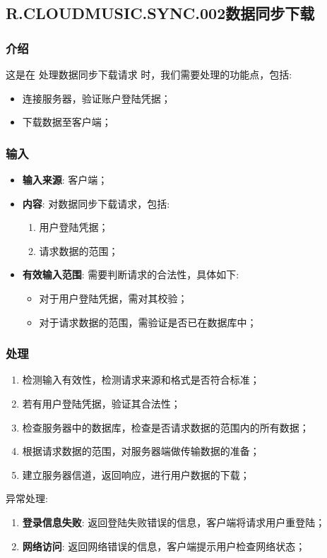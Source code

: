 \begin{enumerate}
\subsection{R.CLOUDMUSIC.SYNC.002数据同步下载}
\subsubsection{介绍}
	这是在 处理数据同步下载请求 时，我们需要处理的功能点，包括: 
	\begin{itemize}
		\item 连接服务器，验证账户登陆凭据；
		\item 下载数据至客户端；
	\end{itemize}
\subsubsection{输入}
	\begin{itemize}
		\item \textbf{输入来源}: 客户端；
		\item \textbf{内容}: 对数据同步下载请求，包括: 
		\begin{enumerate}
			\item 用户登陆凭据；
			\item 请求数据的范围；
		\end{enumerate}
		\item \textbf{有效输入范围}: 需要判断请求的合法性，具体如下: 
		\begin{itemize}
			\item 对于用户登陆凭据，需对其校验； 
			\item 对于请求数据的范围，需验证是否已在数据库中； 
		\end{itemize}
	\end{itemize}
\subsubsection{处理}
	\begin{enumerate}
		\item 检测输入有效性，检测请求来源和格式是否符合标准；
		\item 若有用户登陆凭据，验证其合法性；
		\item 检查服务器中的数据库，检查是否请求数据的范围内的所有数据；
		\item 根据请求数据的范围，对服务器端做传输数据的准备；
		\item 建立服务器信道，返回响应，进行用户数据的下载；
	\end{enumerate}
	\noindent 异常处理: 
	\begin{enumerate}
		\item \textbf{登录信息失败}: 返回登陆失败错误的信息，客户端将请求用户重登陆；
		\item \textbf{网络访问}: 返回网络错误的信息，客户端提示用户检查网络状态；
	\end{enumerate}

\end{enumerate}
